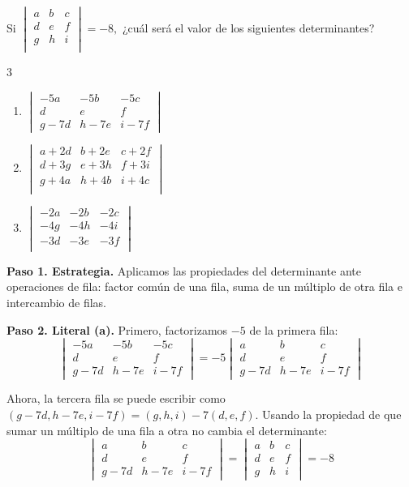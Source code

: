 \begin{prob}
Si $\begin{vmatrix}
a&b&c\\d&e&f\\g&h&i\\
\end{vmatrix}=-8,$ ¿cuál será el valor de los siguientes determinantes? 

\begin{multicols}{3}
\begin{enumerate}[$(a)$]
\item $\begin{vmatrix}
-5a&-5b&-5c\\d&e&f\\g-7d&h-7e&i-7f
\end{vmatrix}$

\item $\begin{vmatrix}
a+2d&b+2e&c+2f\\d+3g&e+3h&f+3i\\g+4a&h+4b&i+4c\\
\end{vmatrix}$

\item $\begin{vmatrix}
-2a&-2b&-2c\\-4g&-4h&-4i\\-3d&-3e&-3f\\
\end{vmatrix}$
\end{enumerate}
\end{multicols}

\begin{myproof}
\textbf{Paso 1. Estrategia.} Aplicamos las propiedades del determinante ante operaciones de fila: factor común de una fila, suma de un múltiplo de otra fila e intercambio de filas.

\textbf{Paso 2. Literal (a).} Primero, factorizamos $-5$ de la primera fila:
$$\begin{vmatrix}
-5a&-5b&-5c\\d&e&f\\g-7d&h-7e&i-7f
\end{vmatrix} = -5\begin{vmatrix}
a&b&c\\d&e&f\\g-7d&h-7e&i-7f
\end{vmatrix}$$

Ahora, la tercera fila se puede escribir como $(g-7d, h-7e, i-7f) = (g,h,i) - 7(d,e,f)$. Usando la propiedad de que sumar un múltiplo de una fila a otra no cambia el determinante:
$$\begin{vmatrix}
a&b&c\\d&e&f\\g-7d&h-7e&i-7f
\end{vmatrix} = \begin{vmatrix}
a&b&c\\d&e&f\\g&h&i
\end{vmatrix} = -8$$


\end{myproof}
\end{prob}
